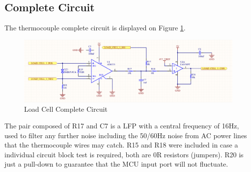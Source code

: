 	\subsection{Complete Circuit}\label{ssec:load-cell-complete-circuit}
		The thermocouple complete circuit is displayed on Figure \ref{fig:load-cell-complete-circuit}.

		\begin{figure}[htbp]
			\centering
				\includegraphics[scale=0.7]{figuras/fig-load-cell-complete-circuit}
			\caption{Load Cell Complete Circuit \cite{load-cell-complete-circuit}}
			\label{fig:load-cell-complete-circuit}
		\end{figure}		

		The pair composed of R17 and C7 is a LFP with a central frequency of 16Hz, used to filter any further noise including the 50/60Hz noise from AC power lines that the thermocouple wires may catch. R15 and R18 were included in case a individual circuit block test is required, both are 0R resistors (jumpers). R20 is just a pull-down to guarantee that the MCU input port will not fluctuate.	